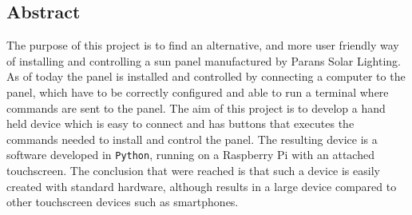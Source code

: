 \documentclass[a4paper]{article}
\begin{document}
    \subsection*{Abstract} %
    \label{sub:abstract}
            The purpose of this project is to find an alternative, and more 
            user friendly way of installing and controlling a sun panel manufactured by Parans Solar Lighting. As of today the panel is installed and controlled by connecting a computer to the panel, which have to be correctly configured and able to run a terminal where commands are sent to the panel. The aim of this project is to develop a hand held device which is easy to connect and has buttons that executes the commands needed to install and control the panel. The resulting device is a software developed in \texttt{Python}, running on a Raspberry Pi with an attached touchscreen.  The conclusion that were reached is that such a device is easily created with standard hardware, although results in a large device compared to other touchscreen devices such as smartphones.

            

    
\end{document}
